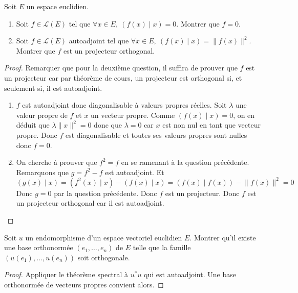 \documentclass[french,a4paper]{article}
\newcommand{\st}{^*}
\theoremstyle{plain}
\theoremstyle{definition}
\theoremstyle{remark}
\begin{document}
\begin{ex}{}
	Soit $E$ un espace euclidien.
	\begin{enumerate}
		\item Soit $f\in\mathcal{L}(E)$ tel que $\forall x\in E,\ (f(x)\mid x)=0$. Montrer que $f=0$.
		\item Soit $f\in\mathcal{L}(E)$ autoadjoint tel que $\forall x\in E,\ (f(x)\mid x)=\lVert f(x)\rVert^2$. Montrer que $f$ est un projecteur orthogonal.
	\end{enumerate}
\end{ex}
\begin{proof}
	Remarquer que pour la deuxième question, il suffira de prouver que $f$ est un projecteur car par théorème de cours, un projecteur est orthogonal si, et seulement si, il est autoadjoint.
	\begin{enumerate}
		\item $f$ est autoadjoint donc diagonalisable à valeurs propres réelles. Soit $\lambda$ une valeur propre de $f$ et $x$ un vecteur propre. Comme $(f(x)\mid x)=0$, on en déduit que $\lambda\lVert x\rVert^2=0$ donc que $\lambda=0$ car $x$ est non nul en tant que vecteur propre. Donc $f$ est diagonalisable et toutes ses valeurs propres sont nulles donc $f=0$.
		\item On cherche à prouver que $f^2=f$ en se ramenant à la question précédente. Remarquons que $g=f^2-f$ est autoadjoint. Et $$(g(x)\mid x)=(f^2(x)\mid x)-(f(x)\mid x)=(f(x)\mid f(x))-\lVert f(x)\rVert^2=0$$ Donc $g=0$ par la question précédente. Donc $f$ est un projecteur. Donc $f$ est un projecteur orthogonal car il est autoadjoint.
	\end{enumerate}
\end{proof}

\begin{ex}{}
	Soit $u$ un endomorphisme d'un espace vectoriel euclidien $E$. Montrer qu'il existe une base orthonormée $(e_1,\ldots,e_n)$ de $E$ telle que la famille $(u(e_1),\ldots,u(e_n))$ soit orthogonale.
\end{ex}
\begin{proof}
	Appliquer le théorème spectral à $u\st u$ qui est autoadjoint. Une base orthonormée de vecteurs propres convient alors.
\end{proof}
\end{document}

